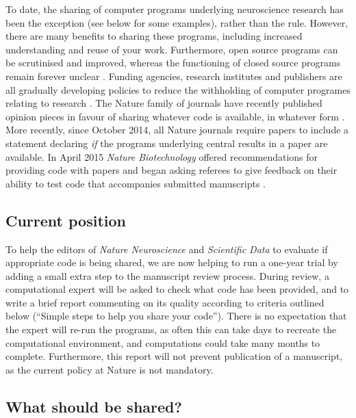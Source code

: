 \documentclass[11pt]{article}
\begin{document}
To date, the sharing of computer programs underlying neuroscience
research has been the exception (see below for some examples), rather than the rule.  However, there
are many benefits to sharing these programs, including increased
understanding and reuse of your work.  Furthermore, open source programs can be scrutinised and improved, whereas the functioning of closed source
programs remain forever unclear \cite{Vihinen2015}.  Funding agencies, research institutes and publishers are all gradually developing policies to
reduce the withholding of computer programes relating to research
\cite{Morin2012-65e}.  The Nature family of journals have recently
published opinion pieces in favour of sharing whatever code is
available, in whatever form \cite{Barnes2010-iv,Ince2012-225}.  More
recently, since October 2014, all Nature journals require papers to
include a statement declaring \textit{if} the programs underlying central
results in a paper are available. In April 2015 \textit{Nature Biotechnology} offered recommendations for providing code with papers and began asking referees to give feedback on their ability to test code that accompanies submitted manuscripts \cite{NatBiotech2015}.

\subsection*{Current position}

To help the editors of \textit{Nature Neuroscience} and
\textit{Scientific Data} to evaluate if appropriate code is being
shared, we are now helping to run a one-year trial by adding a small
extra step to the manuscript review process.  During review, a
computational expert will be asked to check what code has been
provided, and to write a brief report commenting on its quality
according to criteria outlined below (``Simple steps to help you share
your code'').  There is no expectation that the expert will re-run the
programs, as often this can take days to recreate the computational
environment, and computations could take many months to complete.
Furthermore, this report will not prevent publication of a manuscript, as the current policy at Nature is not mandatory.


\subsection*{What should be shared?}
\end{document}
